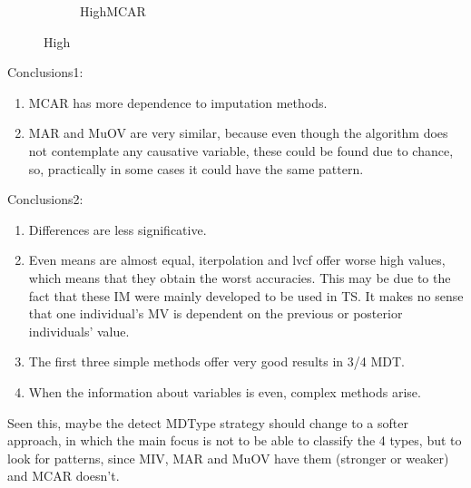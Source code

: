 \documentclass{article}
\begin{document}
\begin{figure}
\begin{subfigure}[b]{0.45\textwidth}
							\caption{HighMCAR}
							\label{fig:HighMCAR}
						\end{subfigure}
						\caption{High}\label{fig:High}
					\end{figure}
					
					\clearpage
		
			Conclusions1:
			
			\begin{enumerate}
				\item MCAR has more dependence to imputation methods.  
				\item MAR and MuOV are very similar, because even though the algorithm does not contemplate any causative variable, these could be found due to chance, so, practically in some cases it could have the same pattern.
			\end{enumerate}
			
			Conclusions2:
			
			\begin{enumerate}
				\item Differences are less significative.
				\item Even means are almost equal, iterpolation and lvcf offer worse high values, which means that they obtain the worst accuracies. This may be due to the fact that these IM were mainly developed to be used in TS. It makes no sense that one individual's MV is dependent on the previous or posterior individuals' value.
				\item The first three simple methods offer very good results in 3/4 MDT.
				\item When the information about variables is even, complex methods arise.
			\end{enumerate}
			
Seen this, maybe the detect MDType strategy should change to a softer approach, in which the main focus is not to be able to classify the 4 types, but to look for patterns, since MIV, MAR and MuOV have them (stronger or weaker) and MCAR doesn't.
			
			
	
\end{document}
